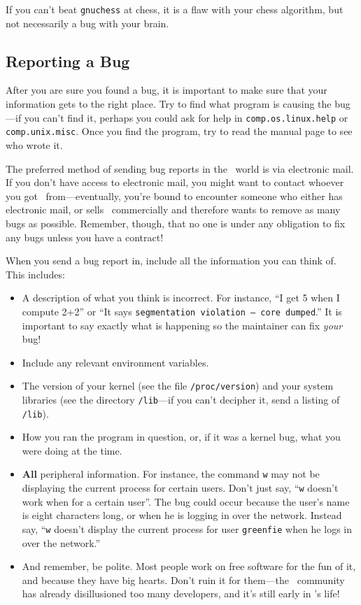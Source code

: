 If you can't beat {\tt gnuchess} at chess, it is a
flaw with your chess algorithm, but not necessarily a bug with your
brain.

\subsection{Reporting a Bug}\label{error-reporting}

After you are sure you found a bug, it is important to make sure that
your information gets to the right place.  Try to find what program is
causing the bug---if you can't find it, perhaps you could ask for help
in {\tt comp.os.linux.help} or {\tt comp.unix.misc}. Once you find the
program, try to read the manual page to see who wrote it.

The preferred method of sending bug reports in the \linux\ world is
via electronic mail. If you don't have access to electronic mail, you
might want to contact whoever you got \linux\ from---eventually,
you're bound to encounter someone who either has electronic mail, or
sells \linux\ commercially and therefore wants to remove as many bugs
as possible.  Remember, though, that no one is under any obligation to
fix any bugs unless you have a contract!

When you send a bug report in, include all the information you can
think of.  This includes:
\begin{itemize}
\item A description of what you think is incorrect.  For instance,
  ``I get 5 when I compute 2+2'' or ``It says {\tt segmentation
    violation -- core dumped}.'' It is important to say exactly what
  is happening so the maintainer can fix {\em your\/} bug!
\item Include any relevant environment variables.
\item The version of your kernel (see the file {\tt /proc/version})
  and your system libraries (see the directory {\tt /lib}---if you
  can't decipher it, send a listing of {\tt /lib}).
\item How you ran the program in question, or, if it was a kernel bug,
  what you were doing at the time.
\item {\bf All} peripheral information.  For instance, the command
  {\tt w} may not be displaying the current process for
  certain users. Don't just say, ``{\tt w} doesn't work when for a
  certain user''.  The bug could occur because the user's name is
  eight characters long, or when he is logging in over the network.
  Instead say, ``{\tt w} doesn't display the current process for user
  {\tt greenfie} when he logs in over the network.''
\item And remember, be polite.  Most people work on free software for
  the fun of it, and because they have big hearts.  Don't ruin it for
  them---the \linux\ community has already disillusioned too many
  developers, and it's still early in \linux's life!
\end{itemize}

